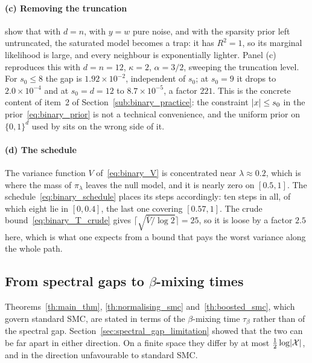 \documentclass[aos]{imsart}%
\DeclarePairedDelimiter{\abs}{\lvert}{\rvert}
\newcommand{\ambientspace}[0]{\mathcal{X}}
\theoremstyle{plain}
\theoremstyle{definition}
\begin{document}
    \paragraph{(c) Removing the truncation}
    \citet[Appendix~B]{YangWainwrightJordan2016} show that with $d=n$, with
    $y=w$ pure noise, and with the sparsity prior left untruncated, the
    saturated model becomes a trap: it has $R^{2}=1$, so its marginal
    likelihood is large, and every neighbour is exponentially lighter. Panel
    (c) reproduces this with $d=n=12$, $\kappa=2$, $\alpha=3/2$, sweeping the
    truncation level. For $s_0\leq8$ the gap is $1.92\times10^{-2}$,
    independent of $s_0$; at $s_0=9$ it drops to $2.0\times10^{-4}$ and at
    $s_0=d=12$ to $8.7\times10^{-5}$, a factor $221$. This is the concrete
    content of item~2 of Section~\ref{sub:binary_practice}: the constraint
    $\abs x\leq s_0$ in the prior~\eqref{eq:binary_prior} is not a technical
    convenience, and the uniform prior on $\{0,1\}^{d}$ used by
    \citet{Schafer2013-yq} sits on the wrong side of it.

    \paragraph{(d) The schedule}
    The variance function $V$ of~\eqref{eq:binary_V} is concentrated near
    $\lambda\approx0.2$, which is where the mass of $\pi_\lambda$ leaves the
    null model, and it is nearly zero on $[0.5,1]$. The
    schedule~\eqref{eq:binary_schedule} places its steps accordingly: ten
    steps in all, of which eight lie in $[0,0.4]$, the last one covering
    $[0.57,1]$. The crude bound~\eqref{eq:binary_T_crude} gives
    $\lceil\sqrt{\bar V/\log2}\rceil=25$, so it is loose by a factor $2.5$
    here, which is what one expects from a bound that pays the worst variance
    along the whole path.


    \subsection{From spectral gaps to $\beta$-mixing times}
    \label{sub:binary_taubeta}

    Theorems~\ref{th:main_thm}, \ref{th:normalising_smc}
    and~\ref{th:boosted_smc}, which govern standard SMC, are stated in terms of
    the $\beta$-mixing time $\tau_\beta$ rather than of the spectral gap.
    Section~\ref{sec:spectral_gap_limitation} showed that the two can be far
    apart in either direction. On a finite space they differ by at most
    $\tfrac12\log\abs{\ambientspace}$, and in the direction unfavourable to
    standard SMC.
\end{document}
